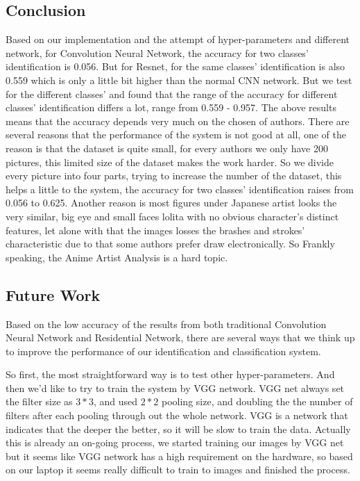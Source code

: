 \documentclass{article}
\begin{document}
\subsection{Conclusion}
Based on our implementation and the attempt of hyper-parameters and different network, for Convolution Neural Network, the accuracy for two classes' identification is 0.056. But for Resnet, for the same classes' identification is also 0.559 which is only a little bit higher than the normal CNN network. But we test for the different classes' and found that the range of the accuracy for different classes' identification differs a lot, range from 0.559 - 0.957. The above results means that the accuracy depends very much on the chosen of authors. There are several reasons that the performance of the system is not good at all, one of the reason is that the dataset is quite small, for every authors we only have 200 pictures, this limited size of the dataset makes the work harder. So we divide every picture into four parts, trying to increase the number of the dataset, this helps a little to the system, the accuracy for two classes' identification raises from 0.056 to 0.625. Another reason is most figures under Japanese artist looks the very similar, big eye and small faces lolita with no obvious character's distinct features, let alone with that the images losses the brashes and strokes' characteristic due to that some authors prefer draw electronically. So Frankly speaking, the Anime Artist Analysis is a hard topic. 
    
\subsection{Future Work}
Based on the low accuracy of the results from both traditional Convolution Neural Network and Residential Network, there are several ways that we think up to improve the performance of our identification and classification system. 

So first, the most straightforward way is to test other hyper-parameters. And then we'd like to try to train the system by VGG network. VGG net always set the filter size as $3*3$, and used $2*2$ pooling size, and doubling the the number of filters after each pooling through out the whole network. VGG is a network that indicates that the deeper the better, so it will be slow to train the data. Actually this is already an on-going process, we started training our images by VGG net but it seems like VGG network has a high requirement on the hardware, so based on our laptop it seems really difficult to train to images and finished the process. 
\end{document}
